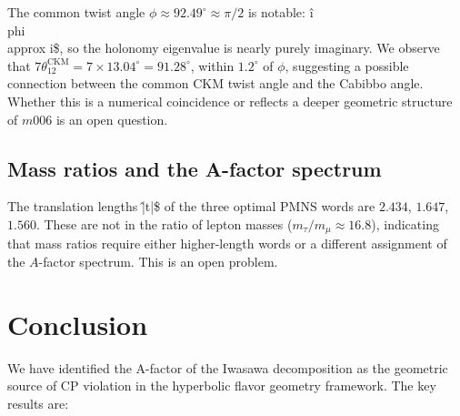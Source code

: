 \documentclass[epjc3]{svjour3}
\begin{document}
The common twist angle $\phi \approx 92.49^\circ \approx \pi/2$
is notable: \^{i\\phi} \\approx i\$, so the holonomy eigenvalue
is nearly purely imaginary. We observe that
$7\theta_{12}^{\mathrm{CKM}} = 7 \times 13.04^\circ = 91.28^\circ$,
within $1.2^\circ$ of $\phi$, suggesting a possible connection
between the common CKM twist angle and the Cabibbo angle.
Whether this is a numerical coincidence or reflects a deeper
geometric structure of $m006$ is an open question.

\subsection{Mass ratios and the A-factor spectrum}

The translation lengths \^{|t|}\$ of the three optimal PMNS words
are $2.434$, $1.647$, $1.560$. These are not in the ratio of
lepton masses ($m_\tau/m_\mu \approx 16.8$), indicating that
mass ratios require either higher-length words or a different
assignment of the $A$-factor spectrum. This is an open problem.

\section{Conclusion}
\label{sec:conclusion}

We have identified the A-factor of the Iwasawa decomposition as
the geometric source of CP violation in the hyperbolic flavor
geometry framework. The key results are:
\end{document}
